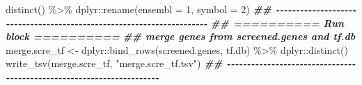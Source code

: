 \documentclass[
]{article}
\newenvironment{Shaded}{\begin{snugshade}}{\end{snugshade}}
\newcommand{\AttributeTok}[1]{\textcolor[rgb]{0.77,0.63,0.00}{#1}}
\newcommand{\DecValTok}[1]{\textcolor[rgb]{0.00,0.00,0.81}{#1}}
\newcommand{\DocumentationTok}[1]{\textcolor[rgb]{0.56,0.35,0.01}{\textbf{\textit{#1}}}}
\newcommand{\FunctionTok}[1]{\textcolor[rgb]{0.00,0.00,0.00}{#1}}
\newcommand{\NormalTok}[1]{#1}
\newcommand{\OtherTok}[1]{\textcolor[rgb]{0.56,0.35,0.01}{#1}}
\newcommand{\SpecialCharTok}[1]{\textcolor[rgb]{0.00,0.00,0.00}{#1}}
\newcommand{\StringTok}[1]{\textcolor[rgb]{0.31,0.60,0.02}{#1}}
\begin{document}
\begin{Shaded}
\begin{Highlighting}[]
  \FunctionTok{distinct}\NormalTok{() }\SpecialCharTok{\%\textgreater{}\%} 
\NormalTok{  dplyr}\SpecialCharTok{::}\FunctionTok{rename}\NormalTok{(}\AttributeTok{ensembl =} \DecValTok{1}\NormalTok{, }\AttributeTok{symbol =} \DecValTok{2}\NormalTok{)}
\DocumentationTok{\#\# {-}{-}{-}{-}{-}{-}{-}{-}{-}{-}{-}{-}{-}{-}{-}{-}{-}{-}{-}{-}{-}{-}{-}{-}{-}{-}{-}{-}{-}{-}{-}{-}{-}{-}{-}{-}{-}{-}{-}{-}{-}{-}{-}{-}{-}{-}{-}{-}{-}{-}{-}{-}{-}{-}{-}{-}{-}{-}{-}{-}{-}{-}{-}{-}{-}{-}{-}{-}{-}{-} }
\DocumentationTok{\#\# ========== Run block ========== }
\DocumentationTok{\#\# merge genes from \textquotesingle{}screened.genes\textquotesingle{} and \textquotesingle{}tf.db\textquotesingle{}}
\NormalTok{merge.scre\_tf }\OtherTok{\textless{}{-}}\NormalTok{ dplyr}\SpecialCharTok{::}\FunctionTok{bind\_rows}\NormalTok{(screened.genes, tf.db) }\SpecialCharTok{\%\textgreater{}\%} 
\NormalTok{  dplyr}\SpecialCharTok{::}\FunctionTok{distinct}\NormalTok{()}
\FunctionTok{write\_tsv}\NormalTok{(merge.scre\_tf, }\StringTok{"merge.scre\_tf.tsv"}\NormalTok{)}
\DocumentationTok{\#\# {-}{-}{-}{-}{-}{-}{-}{-}{-}{-}{-}{-}{-}{-}{-}{-}{-}{-}{-}{-}{-}{-}{-}{-}{-}{-}{-}{-}{-}{-}{-}{-}{-}{-}{-}{-}{-}{-}{-}{-}{-}{-}{-}{-}{-}{-}{-}{-}{-}{-}{-}{-}{-}{-}{-}{-}{-}{-}{-}{-}{-}{-}{-}{-}{-}{-}{-}{-}{-}{-} }
\end{Highlighting}
\end{Shaded}
\end{document}
